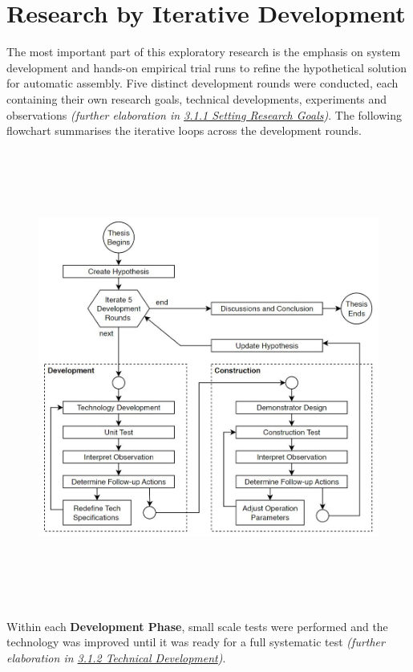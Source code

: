 \documentclass[11pt]{book}
\begin{document}
\section{Research by Iterative Development}

The most important part of this exploratory research is the emphasis on system development and hands-on empirical trial runs to refine the hypothetical solution for automatic assembly. Five distinct development rounds were conducted, each containing their own research goals, technical developments, experiments and observations \textit{(further elaboration in \underline{3.1.1 Setting Research Goals})}. The following flowchart summarises the iterative loops across the development rounds. 

\begin{figure}[H]
\includegraphics[width=15.92cm,height=14.96cm]{./images/image8.jpg}
\end{figure}


Within each \textbf{Development Phase}, small scale tests were performed and the technology was improved until it was ready for a full systematic test \textit{(further elaboration in \underline{3.1.2 Technical Development})}. 
\end{document}
